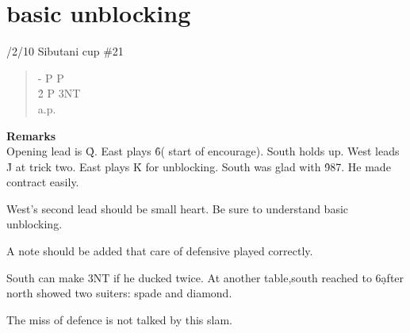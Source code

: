 \section{basic unblocking}

/2/10 Sibutani cup \#21
\begin{quote}
%
  {}%
  {}
  {}%
  {}%
\end{quote}
\begin{quote}
\begin{bidding}
- \> P  \> P \d  \\
2\h {}\s \> P \> 3NT\\
a.p.
\end{bidding}
\end{quote}
{\bf Remarks}\\

Opening lead is \h Q. East plays \h 6(
start of encourage). South holds up.
West leads \h J at trick two. East plays \h K
for unblocking. South was glad with \h 987.
He made contract easily. 

West's second lead should be small heart.
Be sure to understand basic unblocking.

A note should be added that care of defensive 
played correctly.

South can make 3NT if he ducked twice.
At another table,south reached to 6\d after
north showed two suiters: spade and diamond.

The miss of defence is not talked by this slam.




